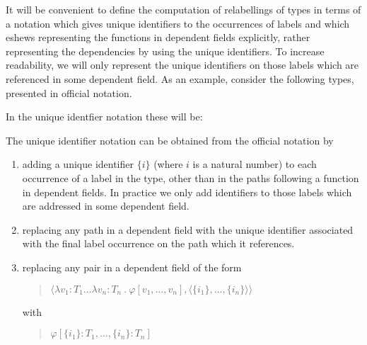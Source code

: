 It will be convenient to define the computation of 
relabellings of types in terms of a notation which gives unique
identifiers to the occurrences of labels and which eshews representing
the functions in dependent fields explicitly, rather representing the
dependencies by using the unique identifiers.  To increase
readability, we will only represent the unique identifiers on those
labels which are referenced in some dependent field.  As an example,
consider the following types, presented in official notation.
\begin{quote}

\bigskip

\end{quote}
In the unique identfier notation these will be:
\begin{quote}

\bigskip


\end{quote}
The unique identifier notation can be obtained from the official
notation by 
\begin{enumerate} 
 
\item adding a unique identifier $\{i\}$ (where $i$ is a natural
  number) to each occurrence of a label in the type, other than in the paths
  following a function in dependent fields.  In practice we only add
  identifiers to those labels which are addressed in some dependent
  field. 

\item replacing any path in a dependent field with the unique identifier
  associated with the final label occurrence on the path which it references.
 
\item replacing any pair in a dependent field of the form 
\begin{quote}
$\langle\lambda v_1:T_1\ldots\lambda v_n:T_n\
.\ \varphi[v_1,\ldots,v_n], \langle \{i_1\},...,\{i_n\}\rangle\rangle$
\end{quote}
with
\begin{quote}
$\varphi[\{i_1\}:T_1,\ldots,\{i_n\}:T_n]$
\end{quote}
 
\end{enumerate} 
